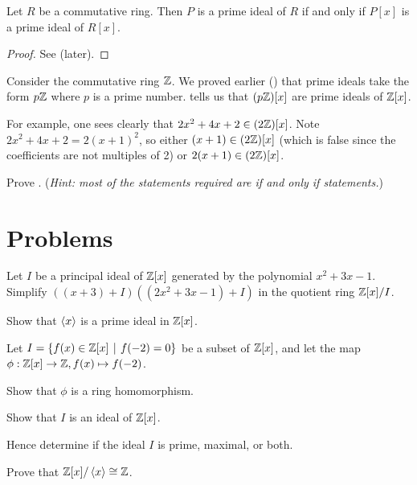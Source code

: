 \begin{theorem}\label{thrm-prime-ideal-iff-prime-ideal-in-polynomial-ring}
    Let $R$ be a commutative ring. Then $P$ is a prime ideal of $R$ if and only if $P[x]$ is a prime ideal of $R[x]$.
\end{theorem}
\begin{proof}
    See  (later).
\end{proof}
\begin{example}
    Consider the commutative ring $\mathbb{Z}$. We proved earlier () that prime ideals take the form $p\mathbb{Z}$ where $p$ is a prime number.  tells us that $(p\mathbb{Z})[x]$ are prime ideals of $\mathbb{Z}[x]$.

    For example, one sees clearly that $2x^2 + 4x + 2 \in (2\mathbb{Z})[x]$. Note $2x^2 + 4x + 2 = 2(x+1)^2$, so either $(x+1) \in (2\mathbb{Z})[x]$ (which is false since the coefficients are not multiples of 2) or $2(x+1) \in (2\mathbb{Z})[x]$.
\end{example}

\begin{exercise}\label{exercise-prime-ideal-iff-prime-ideal-in-polynomial-ring}
    Prove .\newline
    (\textit{Hint: most of the statements required are if and only if statements.})
\end{exercise}

\newpage

\section{Problems}
\begin{problem}
    Let $I$ be a principal ideal of $\mathbb{Z}[x]$ generated by the polynomial $x^2 + 3x - 1$. Simplify $\left((x + 3) + I\right)\left((2x^2 + 3x - 1) + I\right)$ in the quotient ring $\mathbb{Z}[x]/I$.
\end{problem}

\begin{problem}
    Show that $\left\langle x\right\rangle$ is a prime ideal in $\mathbb{Z}[x]$.
\end{problem}

\begin{problem}
    Let $I = \{f(x) \in \Z[x] \vert f(-2) = 0\}$ be a subset of $\mathbb{Z}[x]$, and let the map $\phi:\mathbb{Z}[x]\to\mathbb{Z}, f(x) \mapsto f(-2)$.
    \begin{partquestions}{\roman*}
        \item Show that $\phi$ is a ring homomorphism.
        \item Show that $I$ is an ideal of $\mathbb{Z}[x]$.
        \item Hence determine if the ideal $I$ is prime, maximal, or both.
    \end{partquestions}
\end{problem}

\begin{problem}
    Prove that $\mathbb{Z}[x] / \left\langle x\right\rangle \cong \mathbb{Z}$.
\end{problem}
